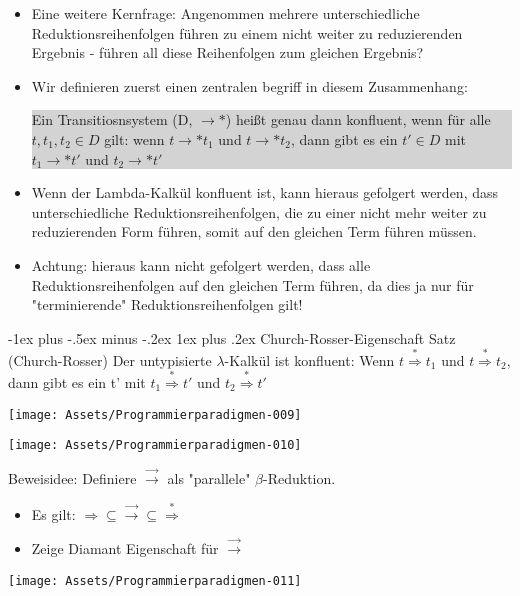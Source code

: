 \documentclass[10pt]{article}
\makeatletter
\renewcommand{\subsubsection}{\@startsection{subsubsection}{3}{0mm}%
                                {-1ex plus -.5ex minus -.2ex}%
                                {1ex plus .2ex}%
                                {\normalfont\small\bfseries}}
\makeatother
\begin{document}
\begin{itemize}
\begin{itemize}
        \end{itemize}
  \item Eine weitere Kernfrage: Angenommen mehrere unterschiedliche Reduktionsreihenfolgen führen zu einem nicht weiter zu reduzierenden Ergebnis - \color{blue} führen all diese Reihenfolgen zum gleichen Ergebnis? \color{black}
  \item Wir definieren zuerst einen zentralen begriff in diesem Zusammenhang:
        \colorbox{lightgray}{\begin{minipage}[h]{1.0\linewidth}
            Ein Transitiosnsystem (D, $\rightarrow*$) heißt genau dann konfluent, wenn für alle $t,t_1,t_2 \in D$ gilt: wenn  $ t \rightarrow* t_1$ und $t \rightarrow* t_2$, dann gibt es ein $t' \in D$ mit $t_1 \rightarrow* t'$  		und $t_2 \rightarrow* t'$
          \end{minipage}}
  \item Wenn der Lambda-Kalkül konfluent ist, kann hieraus gefolgert werden, dass unterschiedliche Reduktionsreihenfolgen, die zu einer nicht mehr weiter zu reduzierenden Form führen, somit auf den gleichen Term führen müssen.
  \item Achtung: hieraus kann nicht gefolgert werden, dass alle Reduktionsreihenfolgen auf den gleichen Term führen, da dies ja nur für "terminierende" Reduktionsreihenfolgen gilt!
\end{itemize}
\subsubsection{Church-Rosser-Eigenschaft}
\color{blue} Satz (Church-Rosser) \newline Der untypisierte $\lambda$-Kalkül ist konfluent: Wenn $t \stackrel{*}{\Rightarrow} t_1$ und $t \stackrel{*}{\Rightarrow} t_2$, dann gibt es ein t' mit $t_1 \stackrel{*}{\Rightarrow} t'$ und $t_2 \stackrel{*}{\Rightarrow} t'$

\begin{center}
  \texttt{[image: Assets/Programmierparadigmen-009]}
\end{center}
\begin{center}
  \texttt{[image: Assets/Programmierparadigmen-010]}
\end{center}
\color{black}
Beweisidee: Definiere $\stackrel{\rightarrow}{\rightarrow}$ als "parallele" $\beta$-Reduktion.
\begin{itemize}
  \item Es gilt: $\Rightarrow \subseteq \stackrel{\rightarrow}{\rightarrow} \subseteq \stackrel{*}{\Rightarrow}$
  \item Zeige Diamant Eigenschaft für $\stackrel{\rightarrow}{\rightarrow}$
\end{itemize}
\begin{center}
  \texttt{[image: Assets/Programmierparadigmen-011]}
  
\end{center}
\end{document}
